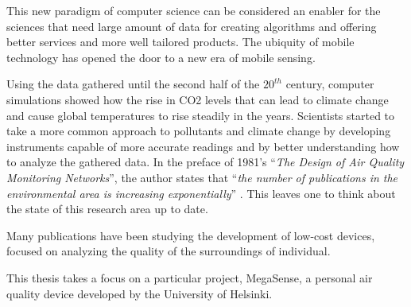 	This new paradigm of computer science can be considered an enabler for the sciences that need large amount of data for creating algorithms and offering better services and more well tailored products.
	The ubiquity of mobile technology has opened the door to a new era of mobile sensing. 
	
	
	Using the data gathered until the second half of the $20^{th}$ century, computer simulations showed how the rise in CO2 levels that can lead to climate change and cause global temperatures to rise steadily in the years.
	Scientists started to take a more common approach to pollutants and climate change by developing instruments capable of more accurate readings and by better understanding how to analyze the gathered data.
	In the preface of 1981's ``\textit{The Design of Air Quality Monitoring Networks}'', the author states that ``\textit{the number of publications in the environmental area is increasing exponentially}'' \cite{airqualitynetworks}.
	This leaves one to think about the state of this research area up to date.
	

	Many publications have been studying the development of low-cost devices, focused on analyzing the quality of the surroundings of individual. 
	
	This thesis takes a focus on a particular project, MegaSense, a personal air quality device developed by the University of Helsinki.
	
